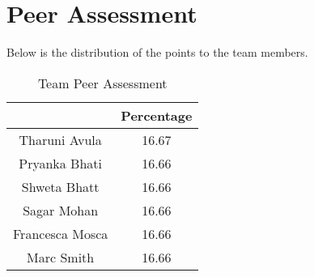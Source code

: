 \documentclass[finalReport.tex]{subfiles}
\begin{document}
\chapter{Peer Assessment}
Below is the distribution of the points to the team members.
\begin{table}[h]
\centering
\begin{tabular}{|c|c|}
\hline 
 & \textbf{Percentage} \\ 
\hline 
Tharuni Avula & 16.67 \\ 
\hline  
Pryanka Bhati & 16.66 \\ 
\hline 
Shweta Bhatt & 16.66 \\ 
\hline
Sagar Mohan & 16.66 \\ 
\hline 
Francesca Mosca & 16.66 \\ 
\hline 
Marc Smith & 16.66 \\ 
\hline 
\end{tabular}
\caption{Team Peer Assessment}
\end{table} 
\end{document}

